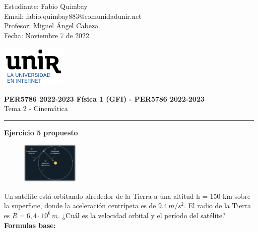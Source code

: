 \documentclass[11pt,letterpaper]{article}
\begin{document}
\pagestyle{plain}

\begin{flushleft}
Estudiante: Fabio Quimbay\\
Email: fabio.quimbay883@comunidadunir.net\\
Profesor: Miguel Ángel Cabeza\\
Fecha: Noviembre 7 de 2022\\
\end{flushleft}

\begin{flushright}\vspace{-20mm}
\includegraphics[height=2cm]{logo.png}
\end{flushright}
 
\begin{center}\vspace{0cm}
\textbf{\large PER5786 2022-2023  Física 1 (GFI) - PER5786 2022-2023}\\
 Tema 2 - Cinemática
\end{center}

 
\rule{\linewidth}{0.1mm}

\bigskip
\bigskip

\textbf{Ejercicio 5 propuesto}\\

\begin{figure}
    \centering
    \includegraphics[width=0.25\textwidth]{ejemplo_5.png}
\end{figure}

Un satélite está orbitando alrededor de la Tierra a una altitud h = 150 km sobre la superficie, donde la aceleración centrípeta es de $9.4\,m/s^2$. El radio de la Tierra es $R = 6,4 \cdot 10^6\,m$. ¿Cuál es la velocidad orbital y el período del satélite?\\

\textbf{Formulas base:}\\
\end{document}
